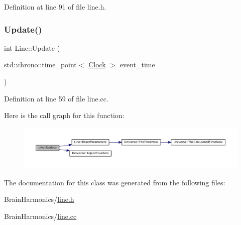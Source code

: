 Definition at line 91 of file line.\+h.

\mbox{\label{class_line_a8c6dece66f5cd93ce40134002a40f505}} 
\subsubsection{\texorpdfstring{Update()}{Update()}}
{\footnotesize\ttfamily int Line\+::\+Update (\begin{DoxyParamCaption}\item[{std\+::chrono\+::time\+\_\+point$<$ \mbox{\hyperlink{universe_8h_a0ef8d951d1ca5ab3cfaf7ab4c7a6fd80}{Clock}} $>$}]{event\+\_\+time }\end{DoxyParamCaption})}



Definition at line 59 of file line.\+cc.

Here is the call graph for this function\+:\nopagebreak
\begin{figure}[H]
\begin{center}
\leavevmode
\includegraphics[width=350pt]{class_line_a8c6dece66f5cd93ce40134002a40f505_cgraph}
\end{center}
\end{figure}


The documentation for this class was generated from the following files\+:\begin{DoxyCompactItemize}
\item 
Brain\+Harmonics/\mbox{\hyperlink{line_8h}{line.\+h}}\item 
Brain\+Harmonics/\mbox{\hyperlink{line_8cc}{line.\+cc}}\end{DoxyCompactItemize}
